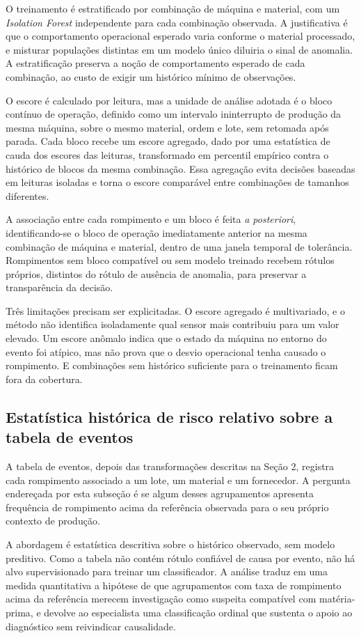 \documentclass[12pt]{article}
\begin{document}
{O treinamento é estratificado por combinação de máquina e material, com um \textit{Isolation Forest} independente para cada combinação observada. A justificativa é que o comportamento operacional esperado varia conforme o material processado, e misturar populações distintas em um modelo único diluiria o sinal de anomalia. A estratificação preserva a noção de comportamento esperado de cada combinação, ao custo de exigir um histórico mínimo de observações.}
%

{O escore é calculado por leitura, mas a unidade de análise adotada é o bloco contínuo de operação, definido como um intervalo ininterrupto de produção da mesma máquina, sobre o mesmo material, ordem e lote, sem retomada após parada. Cada bloco recebe um escore agregado, dado por uma estatística de cauda dos escores das leituras, transformado em percentil empírico contra o histórico de blocos da mesma combinação. Essa agregação evita decisões baseadas em leituras isoladas e torna o escore comparável entre combinações de tamanhos diferentes.}
%

{A associação entre cada rompimento e um bloco é feita \textit{a posteriori}, identificando-se o bloco de operação imediatamente anterior na mesma combinação de máquina e material, dentro de uma janela temporal de tolerância. Rompimentos sem bloco compatível ou sem modelo treinado recebem rótulos próprios, distintos do rótulo de ausência de anomalia, para preservar a transparência da decisão.}
%

{Três limitações precisam ser explicitadas. O escore agregado é multivariado, e o método não identifica isoladamente qual sensor mais contribuiu para um valor elevado. Um escore anômalo indica que o estado da máquina no entorno do evento foi atípico, mas não prova que o desvio operacional tenha causado o rompimento. E combinações sem histórico suficiente para o treinamento ficam fora da cobertura.}
%
\subsection{Estatística histórica de risco relativo sobre a tabela de eventos}
%
{A tabela de eventos, depois das transformações descritas na Seção 2, registra cada rompimento associado a um lote, um material e um fornecedor. A pergunta endereçada por esta subseção é se algum desses agrupamentos apresenta frequência de rompimento acima da referência observada para o seu próprio contexto de produção.}
%

{A abordagem é estatística descritiva sobre o histórico observado, sem modelo preditivo. Como a tabela não contém rótulo confiável de causa por evento, não há alvo supervisionado para treinar um classificador. A análise traduz em uma medida quantitativa a hipótese de que agrupamentos com taxa de rompimento acima da referência merecem investigação como suspeita compatível com matéria-prima, e devolve ao especialista uma classificação ordinal que sustenta o apoio ao diagnóstico sem reivindicar causalidade.}
%
\end{document}
